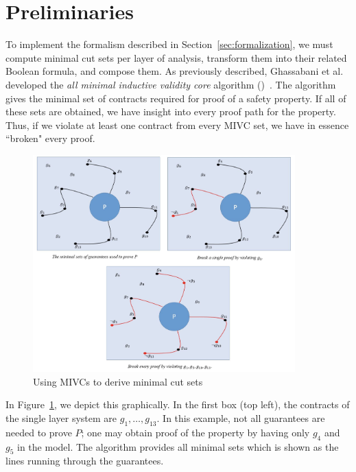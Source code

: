 \section{Preliminaries}
\label{sec:prelim}

%
To implement the formalism described in Section~\ref{sec:formalization}, we must compute minimal cut sets per layer of analysis, transform them into their related Boolean formula, and compose them. As previously described, Ghassabani et al. developed the \textit{all minimal inductive validity core} algorithm (\aivcalg)~\cite{GhassabaniGW16,Ghassabani2017EfficientGO,bendik2018online}. The \aivcalg algorithm gives the minimal set of contracts required for proof of a safety property. If all of these sets are obtained, we have insight into every proof path for the property. Thus, if we violate at least one contract from every MIVC set, we have in essence ``broken" every proof. 
\begin{figure}[h!]
	\begin{center}
		\includegraphics[width=0.9\textwidth]{images/mivcBreaking.png}
	\end{center}
	\caption{Using MIVCs to derive minimal cut sets}
	\label{fig:mivcBreaking}
\end{figure}

In Figure~\ref{fig:mivcBreaking}, we depict this graphically. In the first box (top left), the contracts of the single layer system are $g_1, \dots, g_{13}$. In this example, not all guarantees are needed to prove $P$; one may obtain proof of the property by having only $g_4$ and $g_5$ in the model. The \aivcalg algorithm provides all minimal sets which is shown as the lines running through the guarantees. 

